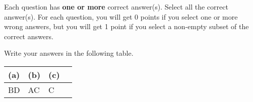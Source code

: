 
Each question has \textbf{one or more} correct answer(s). Select all the correct answer(s). For each question, you will get 0 points if you select one or more wrong answers, but you will get 1 point if you select a non-empty subset of the correct answers.

Write your answers in the following table.


\begin{table}[htbp]
	\centering
	\begin{tabular}{|p{2cm}|p{2cm}|p{2cm}|p{6cm}|}
		\hline
		(a) & (b) & (c) \\
		\hline
		  BD  &  AC   &  C   \\
		\hline
	\end{tabular}
\end{table}

